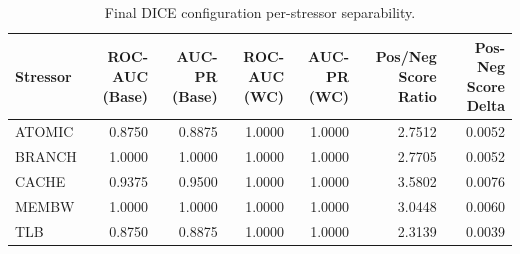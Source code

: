 \begin{table}[t]
\centering
\caption{Final DICE configuration per-stressor separability.}
\label{tab:dice_full_stressor}
\footnotesize
\begin{tabular}{lrrrrrr}
\toprule
Stressor & ROC-AUC (Base) & AUC-PR (Base) & ROC-AUC (WC) & AUC-PR (WC) & Pos/Neg Score Ratio & Pos-Neg Score Delta \\
\midrule
ATOMIC & 0.8750 & 0.8875 & 1.0000 & 1.0000 & 2.7512 & 0.0052 \\
BRANCH & 1.0000 & 1.0000 & 1.0000 & 1.0000 & 2.7705 & 0.0052 \\
CACHE & 0.9375 & 0.9500 & 1.0000 & 1.0000 & 3.5802 & 0.0076 \\
MEMBW & 1.0000 & 1.0000 & 1.0000 & 1.0000 & 3.0448 & 0.0060 \\
TLB & 0.8750 & 0.8875 & 1.0000 & 1.0000 & 2.3139 & 0.0039 \\
\bottomrule
\end{tabular}

\end{table}
